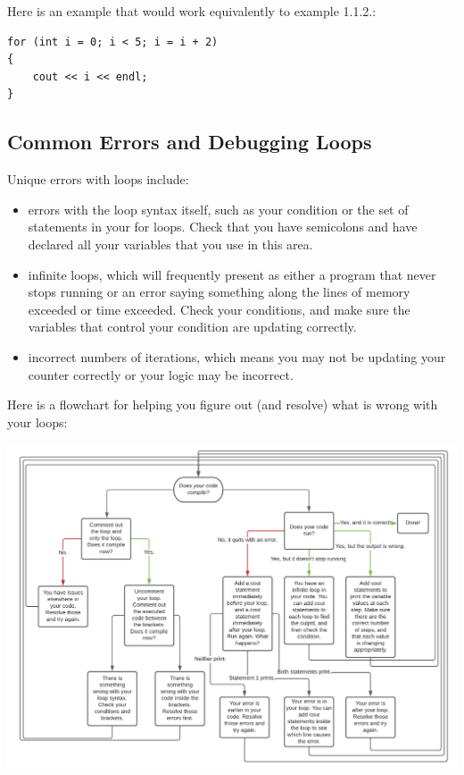 \begin{example}
    Here is an example that would work equivalently to example 1.1.2.:
    \begin{verbatim}
for (int i = 0; i < 5; i = i + 2)
{
	cout << i << endl;
}
    \end{verbatim}
\end{example}

\subsection{Common Errors and Debugging Loops}

Unique errors with loops include:

\begin{itemize}
\item errors with the loop syntax itself, such as your condition or the set of statements in your for loops. Check that you have semicolons and have declared all your variables that you use in this area. 
\item infinite loops, which will frequently present as either a program that never stops running or an error saying something along the lines of memory exceeded or time exceeded. Check your conditions, and make sure the variables that control your condition are updating correctly. 
\item incorrect numbers of iterations, which means you may not be updating your counter correctly or your logic may be incorrect. 
\end{itemize}
Here is a flowchart for helping you figure out (and resolve) what is wrong with your loops:

\includegraphics[width=\textwidth]{images/Loop Debugging.png}

